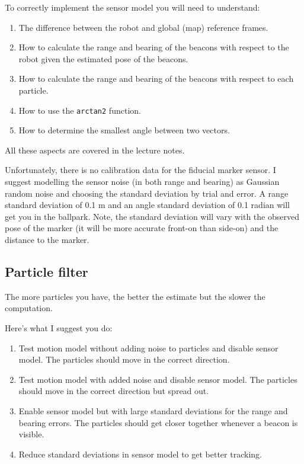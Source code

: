 \documentclass[a4paper, 12pt]{article}
\newcommand{\code}[1]{\texttt{#1}}
\begin{document}
To correctly implement the sensor model you will need to understand:
%
\begin{enumerate}
\item The difference between the robot and global (map) reference frames.

\item How to calculate the range and bearing of the beacons with
  respect to the robot given the estimated pose of the beacons.

\item How to calculate the range and bearing of the beacons with
  respect to each particle.

\item How to use the \code{arctan2} function.

\item How to determine the smallest angle between two vectors.
\end{enumerate}
%
All these aspects are covered in the lecture notes.

Unfortunately, there is no calibration data for the fiducial marker
sensor.  I suggest modelling the sensor noise (in both range and
bearing) as Gaussian random noise and choosing the standard deviation
by trial and error.  A range standard deviation of 0.1 m and an angle
standard deviation of 0.1 radian will get you in the ballpark.  Note,
the standard deviation will vary with the observed pose of the marker
(it will be more accurate front-on than side-on) and the distance to
the marker.

\subsection{Particle filter}

The more particles you have, the better the estimate but the slower
the computation.

Here's what I suggest you do:

\begin{enumerate}
\item Test motion model without adding noise to particles and disable
  sensor model.  The particles should move in the correct direction.

\item Test motion model with added noise and disable sensor model.
  The particles should move in the correct direction but spread out.

\item Enable sensor model but with large standard deviations for the
  range and bearing errors.  The particles should get closer together
  whenever a beacon is visible.

\item Reduce standard deviations in sensor model to get better
  tracking.
\end{enumerate}
\end{document}
